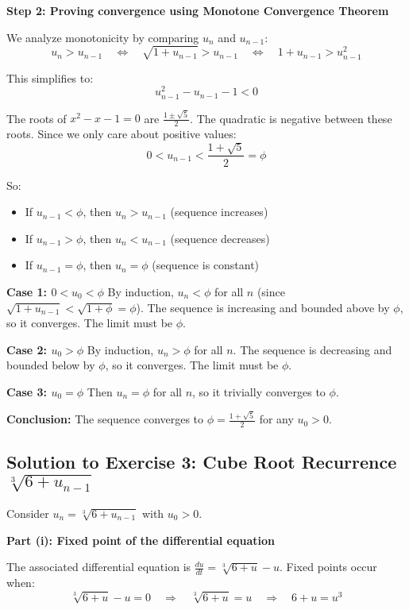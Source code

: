 \documentclass[12pt,a4paper]{article}
\theoremstyle{definition}
\begin{document}
\textbf{Step 2: Proving convergence using Monotone Convergence Theorem}

We analyze monotonicity by comparing $u_n$ and $u_{n-1}$:
\[
u_n > u_{n-1} \quad \Leftrightarrow \quad \sqrt{1 + u_{n-1}} > u_{n-1} \quad \Leftrightarrow \quad 1 + u_{n-1} > u_{n-1}^2
\]

This simplifies to:
\[
u_{n-1}^2 - u_{n-1} - 1 < 0
\]

The roots of $x^2 - x - 1 = 0$ are $\frac{1 \pm \sqrt{5}}{2}$. The quadratic is negative between these roots. Since we only care about positive values:
\[
0 < u_{n-1} < \frac{1 + \sqrt{5}}{2} = \phi
\]

So:
\begin{itemize}
    \item If $u_{n-1} < \phi$, then $u_n > u_{n-1}$ (sequence increases)
    \item If $u_{n-1} > \phi$, then $u_n < u_{n-1}$ (sequence decreases)
    \item If $u_{n-1} = \phi$, then $u_n = \phi$ (sequence is constant)
\end{itemize}

\textbf{Case 1: $0 < u_0 < \phi$}
By induction, $u_n < \phi$ for all $n$ (since $\sqrt{1 + u_{n-1}} < \sqrt{1 + \phi} = \phi$). The sequence is increasing and bounded above by $\phi$, so it converges. The limit must be $\phi$.

\textbf{Case 2: $u_0 > \phi$}
By induction, $u_n > \phi$ for all $n$. The sequence is decreasing and bounded below by $\phi$, so it converges. The limit must be $\phi$.

\textbf{Case 3: $u_0 = \phi$}
Then $u_n = \phi$ for all $n$, so it trivially converges to $\phi$.

\textbf{Conclusion:} The sequence converges to $\phi = \frac{1 + \sqrt{5}}{2}$ for any $u_0 > 0$.

\subsection{Solution to Exercise 3: Cube Root Recurrence $\sqrt[3]{6 + u_{n-1}}$}

Consider $u_n = \sqrt[3]{6 + u_{n-1}}$ with $u_0 > 0$.

\textbf{Part (i): Fixed point of the differential equation}

The associated differential equation is $\frac{du}{dt} = \sqrt[3]{6 + u} - u$. Fixed points occur when:
\[
\sqrt[3]{6 + u} - u = 0 \quad \Rightarrow \quad \sqrt[3]{6 + u} = u \quad \Rightarrow \quad 6 + u = u^3
\]
\end{document}
